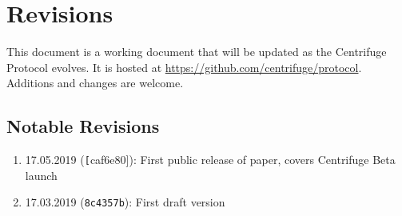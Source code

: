 \section{Revisions}
\label{sec:revisions}
This document is a working document that will be updated as the Centrifuge Protocol evolves. It is hosted at \url{https://github.com/centrifuge/protocol}. Additions and changes are welcome. 
\subsection{Notable Revisions}
\begin{enumerate}
    \item 17.05.2019 (\texttt[caf6e80]): First public release of paper, covers Centrifuge Beta launch
    \item 17.03.2019 (\texttt{8c4357b}): First draft version
\end{enumerate}
